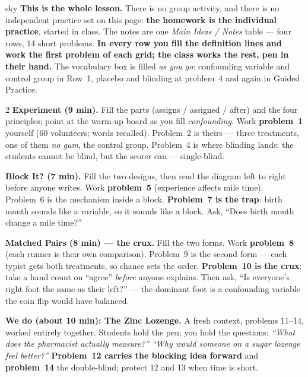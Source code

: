 \documentclass[10pt]{article}
\begin{document}
\boxguard
\begin{skillbox}{sky}
\textbf{This is the whole lesson.} There is no group activity, and there is no independent
practice set on this page: \textbf{the homework is the individual practice}, started in class.
The notes are one \emph{Main Ideas / Notes} table --- four rows, 14 short problems.
\textbf{In every row you fill the definition lines and work the first problem of each grid; the
class works the rest, pen in their hand.} The vocabulary box is filled \emph{as you go}:
confounding variable and control group in Row~1, placebo and blinding at problem~4 and again
in Guided Practice.
\begin{multicols}{2}
\textbf{Experiment (9 min).} Fill the parts (assigns / assigned / after) and the four
principles; point at the warm-up board as you fill \emph{confounding}. Work
\textbf{problem~1} yourself (60 volunteers; words recalled). Problem~2 is theirs --- three
treatments, one of them \emph{no gum}, the control group. Problem~4 is where blinding lands:
the students cannot be blind, but the scorer can --- single-blind.

\textbf{Block It? (7 min).} Fill the two designs, then read the diagram left to right before
anyone writes. Work \textbf{problem~5} (experience affects mile time). Problem~6 is the
mechanism inside a block. \textbf{Problem~7 is the trap}: birth month sounds like a variable,
so it sounds like a block. Ask, ``Does birth month change a mile time?''

\textbf{Matched Pairs (8 min) --- the crux.} Fill the two forms. Work \textbf{problem~8}
(each runner is their own comparison). Problem~9 is the second form --- each typist gets both
treatments, so chance sets the order. \textbf{Problem~10 is the crux}: take a hand count on
``agree'' \emph{before} anyone explains. Then ask, ``Is everyone's right foot the same as
their left?'' --- the dominant foot is a confounding variable the coin flip would have
balanced.

\columnbreak
\textbf{We do (about 10 min): The Zinc Lozenge.} A fresh context, problems 11--14, worked
entirely together. Students hold the pen; you hold the questions: \emph{``What does the
pharmacist actually measure?''} \quad \emph{``Why would someone on a sugar lozenge feel
better?''} \textbf{Problem~12 carries the blocking idea forward} and \textbf{problem~14} the
double-blind; protect 12 and 13 when time is short.


\end{multicols}
\end{skillbox}
\end{document}
